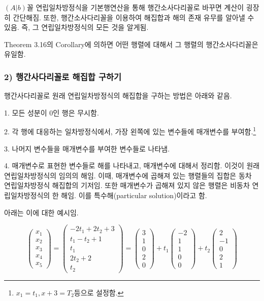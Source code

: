 $(A|b)$꼴 연립일차방정식을 기본행연산을 통해 행간소사다리꼴로 바꾸면 계산이 굉장히 간단해짐. 또한, 행간소사다리꼴을 이용하여 해집합과 해의 존재 유무를 알아낼 수 있음. 즉, 그 연립일차방정식의 모든 것을 알게됨.

Theorem 3.16의 Corollary에 의하면 어떤 행렬에 대해서 그 행렬의 행간소사다리꼴은 유일함.


\newpage


\subsubsection*{2) 행간사다리꼴로 해집합 구하기}
행간사다리꼴로 원래 연립일차방정식의 해집합을 구하는 방법은 아래와 같음.

1. 모든 성분이 0인 행은 무시함.

2. 각 행에 대응하는 일차방정식에서, 가장 왼쪽에 있는 변수들에 매개변수를 부여함.\footnote{$x_1=t_1, x+3=T_2$등으로 설정함.}

3. 나머지 변수들을 매개변수를 부여한 변수들로 나타냄.

4. 매개변수로 표현한 변수들로 해를 나타내고, 매개변수에 대해서 정리함. 이것이 원래 연립일차방정식의 임의의 해임. 이때, 매개변수에 곱해져 있는 행렬들의 집합은 동차 연립일차방정식 해집합의 기저임. 또한 매개변수가 곱해져 있지 않은 행렬은 비동차 연립일차방정식의 한 해임. 이를 특수해(particular solution)이라고 함.

아래는 이에 대한 예시임.

\[
\begin{pmatrix}
x_1\\
x_2\\
x_3\\
x_4\\
x_5
\end{pmatrix}
=
\begin{pmatrix}
-2t_1+2t_2+3\\
t_1-t_2+1\\
t_1\\
2t_2+2\\
t_2
\end{pmatrix}
=
\begin{pmatrix}
3\\
1\\
0\\
2\\
0
\end{pmatrix}
+t_1
\begin{pmatrix}
-2\\
1\\
1\\
0\\
0
\end{pmatrix}
+t_2
\begin{pmatrix}
2\\
-1\\
0\\
2\\
1
\end{pmatrix}
\]

